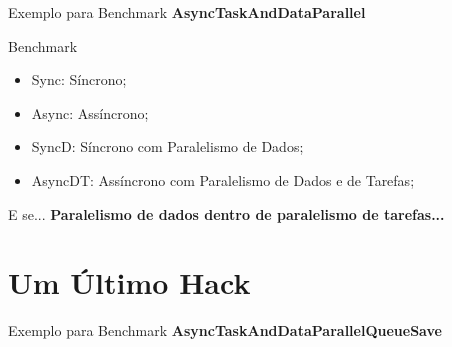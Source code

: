 \documentclass[10pt]{beamer}
\begin{document}
\begin{frame}{Exemplo para Benchmark}
	\textbf{AsyncTaskAndDataParallel}
\end{frame}

\begin{frame}{Benchmark}
	\begin{figure}
	\end{figure}
	\vspace{-0.5cm}
	\scriptsize
	\begin{itemize}
		\item Sync: Síncrono;
		\item Async: Assíncrono;
		\item SyncD: Síncrono com Paralelismo de Dados;
		\item AsyncDT: Assíncrono com Paralelismo de Dados e de Tarefas;
	\end{itemize}
\end{frame}

\begin{frame}{E se...}
	\textbf{Paralelismo de dados dentro de paralelismo de tarefas...}
\end{frame}

\section{Um Último Hack}

\begin{frame}{Exemplo para Benchmark}
	\textbf{AsyncTaskAndDataParallelQueueSave}
\end{frame}
\end{document}
